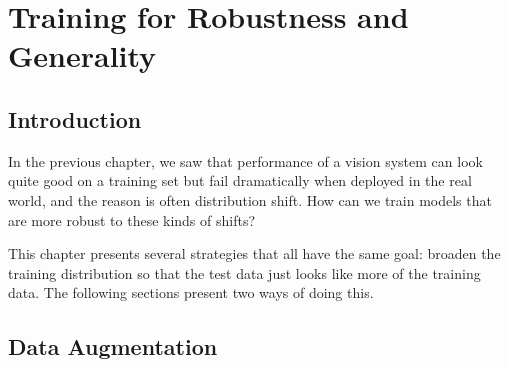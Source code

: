 
\chapter{Training for Robustness and Generality}
\label{chapter:data_augmentation}

\section{Introduction}

In the previous chapter, we saw that performance of a vision system can look quite good on a training set but fail dramatically when deployed in the real world, and the reason is often distribution shift. How can we train models that are more robust to these kinds of shifts?

This chapter presents several strategies that all have the same goal: broaden the training distribution so that the test data just looks like more of the training data. The following sections present two ways of doing this.

\section{Data Augmentation}

